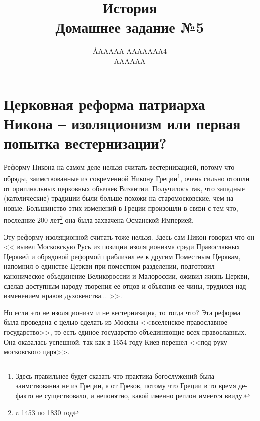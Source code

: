 \documentclass[12pt]{article}
\title{История \\ Домашнее задание №5}
\author{\AA{AAAAA AAAAAAA}{4} \\ AAAAAA}
\begin{document}
  \maketitle

  \section{Церковная реформа патриарха Никона -- изоляционизм\protect\footnotemark{} или первая попытка вестернизации\protect\footnotemark{}?}
  \addtocounter{footnote}{-2}

  Реформу Никона на самом деле нельзя считать вестернизацией, потому что обряды,
  заимствованные из современной Никону Греции\footnote{
    Здесь правильнее будет сказать что практика богослужений была заимствованна не из Греции,
    а от Греков, потому что Греции в то время де-факто не существовало,
    и непонятно, какой именно регион имеется ввиду.
  },
  очень сильно отошли от оригинальных церковных обычаев Византии.
  Получилось так, что западные (католические) традиции были больше похожи на старо\-московские, чем на новые.
  Большинство этих изменений в Греции произошли в связи с тем что,
  последние 200 лет\footnote{c 1453 по 1830 год} она была захвачена Османской Империей.

  Эту реформу изоляционной считать тоже нельзя.
  Здесь сам Никон говорил что он <<%
    вывел Московскую Русь из позиции изоляционизма среди Православных Церквей и обрядовой реформой приблизил ее к другим Поместным Церквам,
    напомнил о единстве Церкви при поместном разделении,
    подготовил каноническое объединение Великороссии и Малороссии,
    оживил жизнь Церкви, сделав доступным народу творения ее отцов и объяснив ее чины,
    трудился над изменением нравов духовенства...%
  >>.

  Но если это не изоляционизм и не вестернизация, то тогда что?
  Эта реформа была проведена с целью сделать из Москвы <<вселенское православное государство>>,
  то есть единое государство объединяющие всех православных.
  Она оказалась успешной, так как в 1654 году Киев перешел <<под руку московского царя>>.
\end{document}
